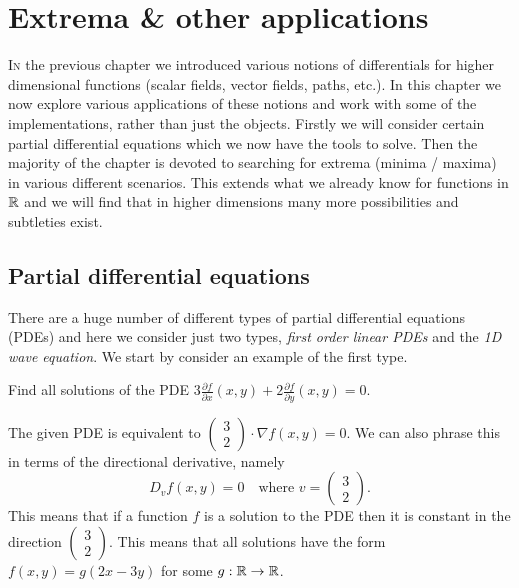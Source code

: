 \chapter{Extrema \& other applications}

\lettrine{I}{n} the previous chapter we introduced various notions of differentials for higher dimensional functions (scalar fields, vector fields, paths, etc.).
In this chapter we now explore various applications of these notions and work with some of the implementations, rather than just the objects.
Firstly we will consider certain partial differential equations which we now have the tools to solve.
Then the majority of the chapter is devoted to searching for extrema (minima / maxima) in various different scenarios.
This extends what we already know for functions in \(\mathbb{R}\) and we will find that in higher dimensions many more possibilities and subtleties exist.

\section{Partial differential equations}

There are a huge number of different types of partial differential equations (PDEs) and here we consider just two types, \emph{first order linear PDEs} and the \emph{1D wave equation}.
We start by consider an example of the first type.

\begin{example*}
    Find all solutions of the PDE
    \(3 \frac{\partial f}{\partial x}(x,y) + 2 \frac{\partial f}{\partial y} (x,y) = 0\).
\end{example*}

\begin{solution}
    The given PDE is equivalent to
    \(\left( \begin{smallmatrix}
            3 \\ 2
        \end{smallmatrix} \right)
    \cdot
    \nabla f(x,y) =0\).
    We can also phrase this in terms of the directional derivative, namely
    \[
        D_{v}f(x,y) = 0 \quad \text{where \(v=\left( \begin{smallmatrix}
                3 \\ 2
            \end{smallmatrix} \right)\)}.
    \]
    This means that if a function \(f\) is a solution to the PDE then it is constant in the direction \(\left( \begin{smallmatrix}
            3 \\ 2
        \end{smallmatrix} \right)\).
    This means that all solutions have the form \(f(x,y) = g(2x-3y)\) for some \(g:\mathbb{R} \to \mathbb{R}\).
\end{solution}

